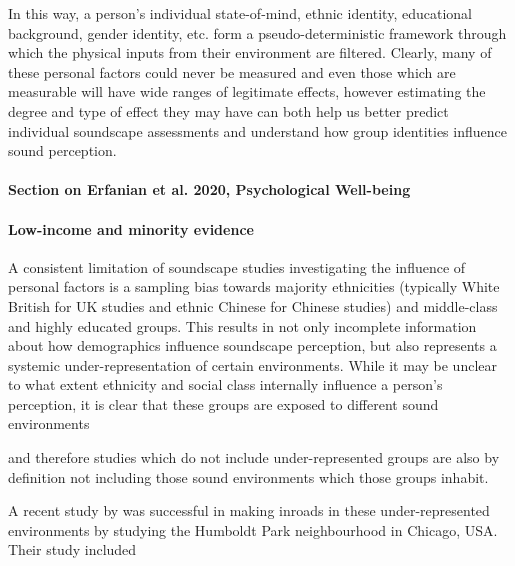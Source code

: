 In this way, a person's individual state-of-mind, ethnic identity, educational background, gender identity, etc. form a pseudo-deterministic framework %
through which the physical inputs from their environment are filtered. Clearly, many of these personal factors could never be measured and even those which are measurable will have wide ranges of legitimate effects, however estimating the degree and type of effect they may have can both help us better predict individual soundscape assessments and understand how group identities influence sound perception.


\paragraph*{Section on Erfanian et al. 2020, Psychological Well-being}


\paragraph*{Low-income and minority evidence} %
A consistent limitation of soundscape studies investigating the influence of personal factors is a sampling bias towards majority ethnicities (typically White British for UK studies and ethnic Chinese for Chinese studies) and middle-class and highly educated groups. %
This results in not only incomplete information about how demographics influence soundscape perception, but also represents a systemic under-representation of certain environments. While it may be unclear to what extent ethnicity and social class internally influence a person's perception, it is clear that these groups are exposed to different sound environments %

and therefore studies which do not include under-represented groups are also by definition not including those sound environments which those groups inhabit.

A recent study by  was successful in making inroads in these under-represented environments by studying the Humboldt Park neighbourhood in Chicago, USA. Their study included


